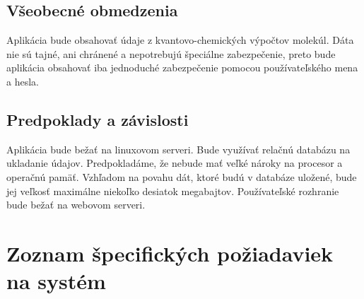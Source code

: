 \documentclass[12pt,a4paper, draft]{article}
\begin{document}
\subsection{Všeobecné obmedzenia}
Aplikácia bude obsahovať údaje z kvantovo-chemických výpočtov mole\-kúl. Dáta nie sú tajné, ani chránené a nepotrebujú špeciálne zabezpečenie, preto bude aplikácia obsahovať iba jednoduché zabezpečenie pomocou používateľského mena a hesla.

\subsection{Predpoklady a závislosti}
Aplikácia bude bežať na linuxovom serveri. Bude využívať relačnú da\-tabázu na ukladanie údajov. Predpokladáme, že nebude mať veľké nároky na procesor a operačnú pamäť. Vzhľadom na povahu dát, ktoré budú v databáze uložené, bude jej veľkosť maximálne niekoľko desiatok megabajtov. Používateľské rozhranie bude bežať na webovom serveri.

\section{Zoznam špecifických požiadaviek na \- systém}
\end{document}
